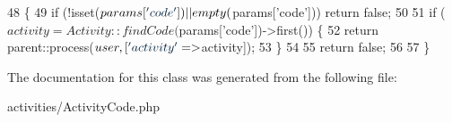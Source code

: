 \begin{DoxyCode}
48     \{
49         \textcolor{keywordflow}{if} (!isset($params[\textcolor{stringliteral}{'code'}]) || empty($params[\textcolor{stringliteral}{'code'}])) \textcolor{keywordflow}{return} \textcolor{keyword}{false};
50 
51         \textcolor{keywordflow}{if} ($activity = Activity::findCode($params[\textcolor{stringliteral}{'code'}])->first()) \{
52             \textcolor{keywordflow}{return} parent::process($user, [\textcolor{stringliteral}{'activity'} => $activity]);
53         \}
54 
55         \textcolor{keywordflow}{return} \textcolor{keyword}{false};
56 
57     \}
\end{DoxyCode}


The documentation for this class was generated from the following file\+:\begin{DoxyCompactItemize}
\item 
activities/Activity\+Code.\+php\end{DoxyCompactItemize}
